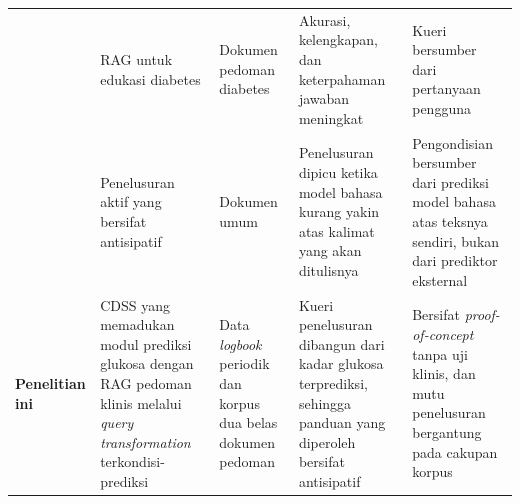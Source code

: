 \begin{longtable}{@{}p{2.2cm}p{2.7cm}p{2.2cm}p{2.6cm}p{2.5cm}@{}}
\textcite{wang2024} & RAG untuk edukasi diabetes & Dokumen pedoman diabetes & Akurasi, kelengkapan, dan keterpahaman jawaban meningkat & Kueri bersumber dari pertanyaan pengguna \\[2pt]

\textcite{jiang2023} & Penelusuran aktif yang bersifat antisipatif & Dokumen umum & Penelusuran dipicu ketika model bahasa kurang yakin atas kalimat yang akan ditulisnya & Pengondisian bersumber dari prediksi model bahasa atas teksnya sendiri, bukan dari prediktor eksternal \\[2pt]

\textbf{Penelitian ini} & CDSS yang memadukan modul prediksi glukosa dengan RAG pedoman klinis melalui \emph{query transformation} terkondisi-prediksi & Data \emph{logbook} periodik dan korpus dua belas dokumen pedoman & Kueri penelusuran dibangun dari kadar glukosa terprediksi, sehingga panduan yang diperoleh bersifat antisipatif & Bersifat \emph{proof-of-concept} tanpa uji klinis, dan mutu penelusuran bergantung pada cakupan korpus \\

\end{longtable}
